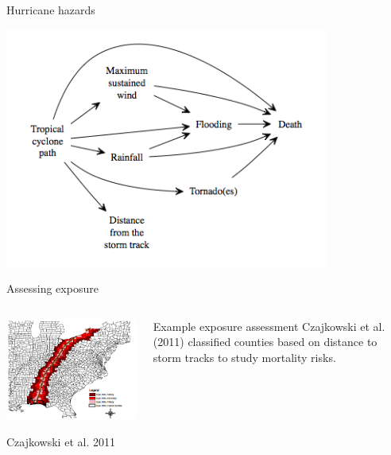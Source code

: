 \documentclass[ignorenonframetext,]{beamer}
\begin{document}
\begin{frame}{Hurricane hazards}

\begin{center}\includegraphics[width=0.8\textwidth]{hurricane_causal_graph} \end{center}

\end{frame}

\begin{frame}{Assessing exposure}

\begin{columns}
\begin{column}{0.7\textwidth}

\begin{center}\includegraphics[width=\textwidth]{coastal_inland_mortality_figure} \end{center}
\vspace{-0.5cm}
\begin{center}
\footnotesize Czajkowski et al. 2011
\end{center}
\end{column}
\begin{column}{0.3\textwidth}
\small
\begin{block}{Example exposure assessment}
Czajkowski et al. (2011) classified counties based on distance to storm tracks to study mortality risks.
\end{block}
\end{column}
\end{columns}

\end{frame}
\end{document}
